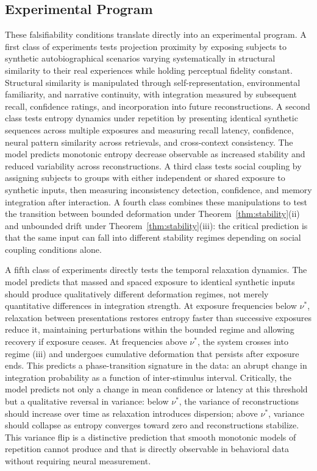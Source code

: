 \documentclass[12pt, a4paper]{article}
\begin{document}
\subsection{Experimental Program}

These falsifiability conditions translate directly into an experimental program. A first class of experiments tests projection proximity by exposing subjects to synthetic autobiographical scenarios varying systematically in structural similarity to their real experiences while holding perceptual fidelity constant. Structural similarity is manipulated through self-representation, environmental familiarity, and narrative continuity, with integration measured by subsequent recall, confidence ratings, and incorporation into future reconstructions. A second class tests entropy dynamics under repetition by presenting identical synthetic sequences across multiple exposures and measuring recall latency, confidence, neural pattern similarity across retrievals, and cross-context consistency. The model predicts monotonic entropy decrease observable as increased stability and reduced variability across reconstructions. A third class tests social coupling by assigning subjects to groups with either independent or shared exposure to synthetic inputs, then measuring inconsistency detection, confidence, and memory integration after interaction. A fourth class combines these manipulations to test the transition between bounded deformation under Theorem~\ref{thm:stability}(ii) and unbounded drift under Theorem~\ref{thm:stability}(iii): the critical prediction is that the same input can fall into different stability regimes depending on social coupling conditions alone.

A fifth class of experiments directly tests the temporal relaxation dynamics. The model predicts that massed and spaced exposure to identical synthetic inputs should produce qualitatively different deformation regimes, not merely quantitative differences in integration strength. At exposure frequencies below $\nu^*$, relaxation between presentations restores entropy faster than successive exposures reduce it, maintaining perturbations within the bounded regime and allowing recovery if exposure ceases. At frequencies above $\nu^*$, the system crosses into regime (iii) and undergoes cumulative deformation that persists after exposure ends. This predicts a phase-transition signature in the data: an abrupt change in integration probability as a function of inter-stimulus interval. Critically, the model predicts not only a change in mean confidence or latency at this threshold but a qualitative reversal in variance: below $\nu^*$, the variance of reconstructions should increase over time as relaxation introduces dispersion; above $\nu^*$, variance should collapse as entropy converges toward zero and reconstructions stabilize. This variance flip is a distinctive prediction that smooth monotonic models of repetition cannot produce and that is directly observable in behavioral data without requiring neural measurement.
\end{document}
